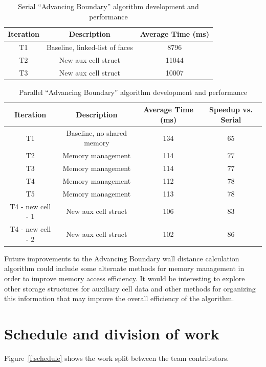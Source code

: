\documentclass[]{aiaa-tc}%
\begin{document}
\begin{table}[h]
  \centering
  \begin{tabular}{ccc}
    Iteration & Description & Average Time (ms) \\
    \hline\hline
    T1 & Baseline, linked-list of faces & 8796 \\
    T2 & New aux cell struct & 11044 \\
    T3 & New aux cell struct & 10007 \\
    \hline
  \end{tabular}
  \caption{Serial ``Advancing Boundary'' algorithm development and performance}
  \label{t:serial}
\end{table}



\begin{table}[h]
  \centering
  \begin{tabular}{cccc}
    Iteration & Description & Average Time (ms) & Speedup vs. Serial\\
    \hline\hline
    T1 & Baseline, no shared memory & 134 & 65\\
    T2 & Memory management & 114 & 77\\
    T3 & Memory management & 114 & 77\\
    T4 & Memory management & 112 & 78\\
    T5 & Memory management & 113 & 78\\
    T4 - new cell - 1 & New aux cell struct & 106 & 83\\
    T4 - new cell - 2& New aux cell struct & 102 & 86\\
    \hline
  \end{tabular}
  \caption{Parallel ``Advancing Boundary'' algorithm development and performance}
  \label{t:parallel}
\end{table}


Future improvements to the Advancing Boundary wall distance
calculation algorithm could include some alternate methods for memory
management in order to improve memory access efficiency. It would be
interesting to explore other storage structures for auxiliary cell
data and other methods for organizing this information that may
improve the overall efficiency of the algorithm.


\section{Schedule and division of work}
Figure~\ref{f:schedule} shows the work split between the team contributors.
\end{document}
